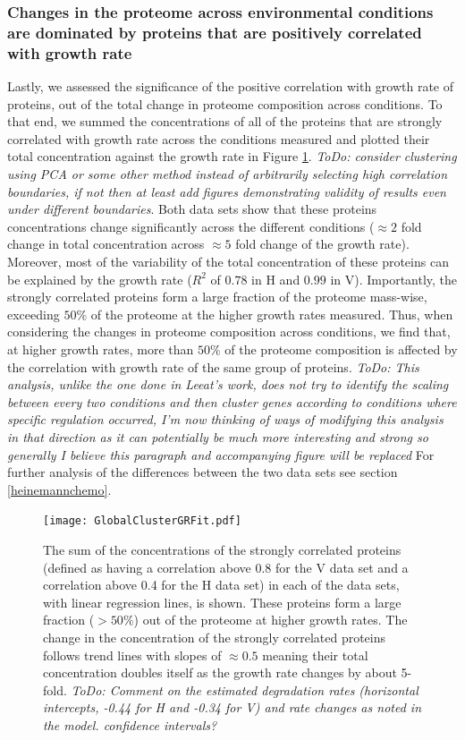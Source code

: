 \documentclass[notitlepage]{article}
\begin{document}
\subsubsection{Changes in the proteome across environmental conditions are dominated by proteins that are positively correlated with growth rate}
Lastly, we assessed the significance of the positive correlation with growth rate of proteins, out of the total change in proteome composition across conditions.
To that end, we summed the concentrations of all of the proteins that are strongly correlated with growth rate across the conditions measured and plotted their total concentration against the growth rate in Figure \ref{fig:globalgrcorr}.
\emph{ToDo: consider clustering using PCA or some other method instead of arbitrarily selecting high correlation boundaries, if not then at least add figures demonstrating validity of results even under different boundaries}.
Both data sets show that these proteins concentrations change significantly across the different conditions ($\approx 2$ fold change in total concentration across $\approx 5$ fold change of the growth rate).
Moreover, most of the variability of the total concentration of these proteins can be explained by the growth rate ($R^2$ of $0.78$ in H and $0.99$ in V). 
Importantly, the strongly correlated proteins form a large fraction of the proteome mass-wise, exceeding $50\%$ of the proteome at the higher growth rates measured.
Thus, when considering the changes in proteome composition across conditions, we find that, at higher growth rates, more than $50\%$ of the proteome composition is affected by the correlation with growth rate of the same group of proteins.
\emph{ToDo: This analysis, unlike the one done in Leeat's work, does not try to identify the scaling between every two conditions and then cluster genes according to conditions where specific regulation occurred, I'm now thinking of ways of modifying this analysis in that direction as it can potentially be much more interesting and strong so generally I believe this paragraph and accompanying figure will be replaced}
For further analysis of the differences between the two data sets see section \ref{heinemannchemo}.

\begin{figure}[h]
\centering
\texttt{[image: GlobalClusterGRFit.pdf]}
\caption{
The sum of the concentrations of the strongly correlated proteins (defined as having a correlation above 0.8 for the V data set and a correlation above 0.4 for the H data set) in each of the data sets, with linear regression lines, is shown.
These proteins form a large fraction ($>50\%$) out of the proteome at higher growth rates.
The change in the concentration of the strongly correlated proteins follows trend lines with slopes of $\approx 0.5$ meaning their total concentration doubles itself as the growth rate changes by about 5-fold.
\emph{ToDo: Comment on the estimated degradation rates (horizontal intercepts, -0.44 for H and -0.34 for V) and rate changes as noted in the model. confidence intervals?}
}
\label{fig:globalgrcorr}
\end{figure}
\end{document}
